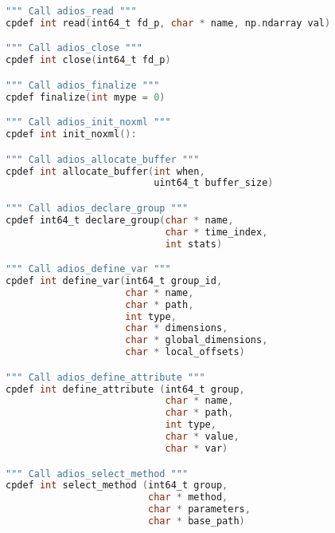 \begin{lstlisting}[language=C,frame=single, backgroundcolor=\color{gray85},caption={Functions for writing and No-XML},label={},]
""" Call adios_read """
cpdef int read(int64_t fd_p, char * name, np.ndarray val)

""" Call adios_close """
cpdef int close(int64_t fd_p)

""" Call adios_finalize """
cpdef finalize(int mype = 0)

""" Call adios_init_noxml """
cpdef int init_noxml():

""" Call adios_allocate_buffer """
cpdef int allocate_buffer(int when,
                          uint64_t buffer_size)

""" Call adios_declare_group """
cpdef int64_t declare_group(char * name,
                            char * time_index,
                            int stats)

""" Call adios_define_var """
cpdef int define_var(int64_t group_id,
                     char * name,
                     char * path,
                     int type,
                     char * dimensions,
                     char * global_dimensions,
                     char * local_offsets)

""" Call adios_define_attribute """
cpdef int define_attribute (int64_t group,
                            char * name,
                            char * path,
                            int type,
                            char * value,
                            char * var)

""" Call adios_select_method """
cpdef int select_method (int64_t group,
                         char * method,
                         char * parameters,
                         char * base_path)
\end{lstlisting}

